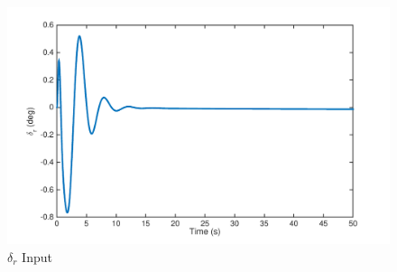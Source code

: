 \documentclass[12pt]{article}
\begin{document}
\begin{figure}[h!]
\begin{center}
\includegraphics[height=.4\textheight]{figures/delta_r}
\caption{$\delta_r$ Input}
\end{center}
\end{figure}
\end{document}
